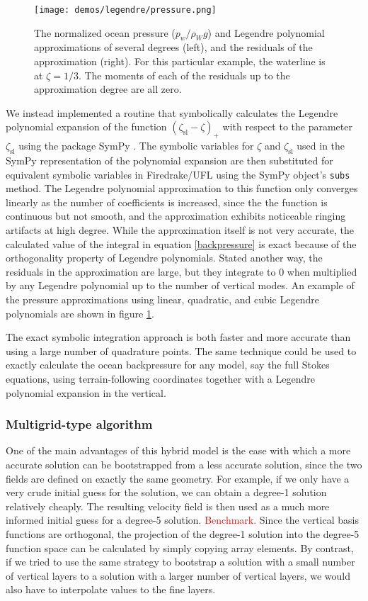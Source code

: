 \documentclass{article}
\theoremstyle{definition}
\theoremstyle{plain}
\begin{document}
\begin{figure}[h]
    \texttt{[image: demos/legendre/pressure.png]}
    \caption{The normalized ocean pressure ($p_w / \rho_Wg$) and Legendre polynomial approximations of several degrees (left), and the residuals of the approximation (right).
    For this particular example, the waterline is at $\zeta = 1/3$.
    The moments of each of the residuals up to the approximation degree are all zero.}
    \label{fig:legendre}
\end{figure}

We instead implemented a routine that symbolically calculates the Legendre polynomial expansion of the function $(\zeta_{\text{sl}} - \zeta)_+$ with respect to the parameter $\zeta_{\text{sl}}$ using the package SymPy \citep{sympy}.
The symbolic variables for $\zeta$ and $\zeta_{\text{sl}}$ used in the SymPy representation of the polynomial expansion are then substituted for equivalent symbolic variables in Firedrake/UFL using the SymPy object's \texttt{subs} method.
The Legendre polynomial approximation to this function only converges linearly as the number of coefficients is increased, since the the function is continuous but not smooth, and the approximation exhibits noticeable ringing artifacts at high degree.
While the approximation itself is not very accurate, the calculated value of the integral in equation \eqref{backpressure} is exact because of the orthogonality property of Legendre polynomials.
Stated another way, the residuals in the approximation are large, but they integrate to 0 when multiplied by any Legendre polynomial up to the number of vertical modes.
An example of the pressure approximations using linear, quadratic, and cubic Legendre polynomials are shown in figure \ref{fig:legendre}.

The exact symbolic integration approach is both faster and more accurate than using a large number of quadrature points.
The same technique could be used to exactly calculate the ocean backpressure for any model, say the full Stokes equations, using terrain-following coordinates together with a Legendre polynomial expansion in the vertical.


\subsubsection{Multigrid-type algorithm}

One of the main advantages of this hybrid model is the ease with which a more accurate solution can be bootstrapped from a less accurate solution, since the two fields are defined on exactly the same geometry.
For example, if we only have a very crude initial guess for the solution, we can obtain a degree-1 solution relatively cheaply.
The resulting velocity field is then used as a much more informed initial guess for a degree-5 solution.
\textcolor{red}{Benchmark.}
Since the vertical basis functions are orthogonal, the projection of the degree-1 solution into the degree-5 function space can be calculated by simply copying array elements.
By contrast, if we tried to use the same strategy to bootstrap a solution with a small number of vertical layers to a solution with a larger number of vertical layers, we would also have to interpolate values to the fine layers.
\end{document}
